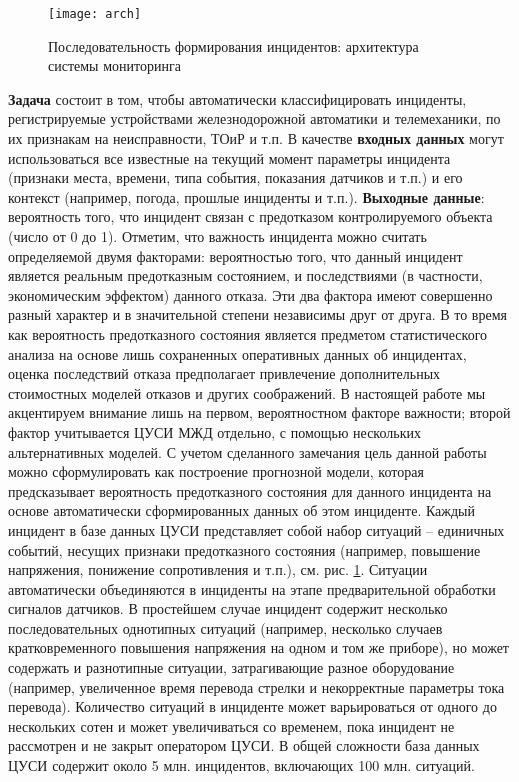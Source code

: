 \begin{figure}[t]
\centering
\texttt{[image: arch]}
\caption{Последовательность формирования инцидентов: архитектура системы мониторинга}
\centering
\label{fig:arch}
\end{figure}
\textbf{Задача} состоит в том, чтобы автоматически классифицировать инциденты, регистрируемые устройствами железнодорожной автоматики и телемеханики,  по их признакам на неисправности, ТОиР и т.п. В качестве \textbf{входных данных} могут использоваться все известные на текущий момент параметры инцидента (признаки места, времени, типа события, показания датчиков и т.п.) и его контекст (например, погода, прошлые инциденты и т.п.). \textbf{Выходные данные}: вероятность того, что инцидент связан с предотказом контролируемого объекта (число от 0 до 1).
Отметим, что важность инцидента можно считать определяемой двумя факторами: вероятностью того, что данный инцидент является реальным предотказным состоянием, и последствиями (в частности, экономическим эффектом) данного отказа. Эти два фактора имеют совершенно разный характер и в значительной степени независимы друг от друга. В то время как вероятность предотказного состояния является предметом статистического анализа на основе лишь сохраненных оперативных данных об инцидентах, оценка последствий отказа предполагает привлечение дополнительных стоимостных моделей отказов и других соображений. В настоящей работе мы акцентируем внимание лишь на первом, вероятностном факторе важности; второй фактор учитывается ЦУСИ МЖД отдельно, с помощью нескольких альтернативных моделей.
С учетом сделанного замечания цель данной работы можно сформулировать как построение прогнозной модели, которая предсказывает вероятность предотказного состояния для данного инцидента на основе автоматически сформированных данных об этом инциденте.
Каждый инцидент в базе данных ЦУСИ представляет собой набор ситуаций -- единичных событий, несущих признаки предотказного состояния (например, повышение напряжения, понижение сопротивления и т.п.), см. рис. \ref{fig:arch}. Ситуации автоматически объединяются в инциденты на этапе предварительной обработки сигналов датчиков. В простейшем случае инцидент содержит несколько последовательных однотипных ситуаций (например, несколько случаев кратковременного повышения напряжения на одном и том же приборе), но может содержать и разнотипные ситуации, затрагивающие разное оборудование (например, увеличенное время перевода стрелки и некорректные параметры тока перевода). Количество ситуаций в инциденте может варьироваться от одного до нескольких сотен и может увеличиваться со временем, пока инцидент не рассмотрен и не закрыт оператором ЦУСИ. В общей сложности база данных ЦУСИ содержит около 5 млн. инцидентов, включающих 100 млн. ситуаций.

